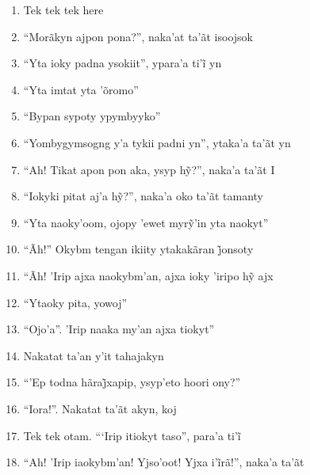 \begin{enumerate}
 \begin{center}\end{center}

 \item Tek tek tek here

 \item ``Morãkyn ajpon pona?'', naka'at ta'ãt isoojsok

 \item ``Yta ioky padna ysokiit'', ypara’a ti’ĩ yn

 \item ``Yta imtat yta 'õromo''

 \item ``Bypan sypoty ypymbyyko''

 \item ``Yombygymsogng y'a tykii padni yn'', ytaka'a ta'ãt yn

 \item ``Ah! Tikat apon pon aka, ysyp hỹ?'', naka’a ta’ãt I

 \item ``Iokyki pitat aj’a hỹ?'', naka’a oko ta’ãt tamanty

 \item ``Yta naoky’oom, ojopy ’ewet myrỹ’in yta naokyt''

 \begin{center}\end{center}

 \item ``Ãh!'' Okybm tengan ikiity ytakakãran j̃onsoty

 \item ``Ãh! ’Irip ajxa naokybm’an, ajxa ioky ’iripo hỹ ajx

 \item ``Ytaoky pita, yowoj''

 \item ``Ojo'a''. 'Irip naaka my'an ajxa tiokyt''

 \item Nakatat ta'an y'it tahajakyn

 \item ``’Ep todna hãraj̃xapip, ysyp’eto hoori ony?''

 \item ``Iora!''. Nakatat ta'ãt akyn, koj

 \item Tek tek otam. ``‘Irip itiokyt taso'', para’a ti’ĩ

 \item ``Ah! ’Irip iaokybm’an! Yjso’oot! Yjxa i’ĩrã!'', naka’a ta’ãt


\end{enumerate}
